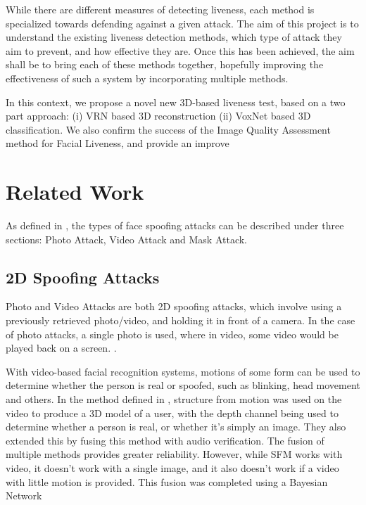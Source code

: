 \documentclass[10pt,a4paper]{article}
\begin{document}
   While there are different measures of detecting liveness, each method is specialized towards defending against a given attack. The aim of this project is to understand
   the existing liveness detection methods, which type of attack they aim to prevent, and how effective they are. Once this has been achieved, the aim shall be to bring
   each of these methods together, hopefully improving the effectiveness of such a system by incorporating multiple methods.


    In this context, we propose a novel new 3D-based liveness test, based on a two part approach: (i) VRN based 3D reconstruction (ii) VoxNet based 3D classification.
    We also confirm the success of the Image Quality Assessment method for Facial Liveness, and provide an improve

\section{Related Work}
    As defined in \cite{FaceSpoofingAttacksStudy}, the types of face spoofing attacks can be described under three sections: Photo Attack, Video Attack and Mask Attack.

    \subsection{2D Spoofing Attacks}
        Photo and Video Attacks are both 2D spoofing attacks, which involve using a previously retrieved photo/video, and holding it in front of a camera. In the case of photo attacks,
        a single photo is used, where in video, some video would be played back on a screen. \cite{FaceSpoofingAttacksStudy}.

        With video-based facial recognition systems, motions of some form can be used to determine whether the person is real or spoofed, such as blinking, head movement and others.
        In the method defined in \cite{SFMClassifier}, structure from motion was used on the video to produce a 3D model of a user, with the depth channel being used to determine whether a person is real, or whether it's simply an image.
        They also extended this by fusing this method with audio verification. The fusion of multiple methods provides greater reliability. However, while SFM works with video, it doesn't work with a single image,
        and it also doesn't work if a video with little motion is provided. This fusion was completed using a Bayesian Network 
\end{document}

